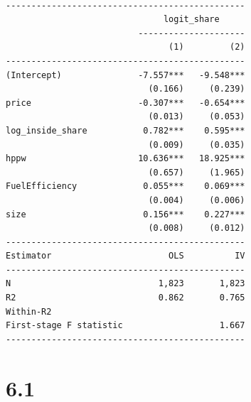 \documentclass[
  letterpaper,
  DIV=11,
  numbers=noendperiod]{scrreprt}
\begin{document}
\begin{verbatim}

-----------------------------------------------
                               logit_share     
                          ---------------------
                                (1)         (2)
-----------------------------------------------
(Intercept)               -7.557***   -9.548***
                            (0.166)     (0.239)
price                     -0.307***   -0.654***
                            (0.013)     (0.053)
log_inside_share           0.782***    0.595***
                            (0.009)     (0.035)
hppw                      10.636***   18.925***
                            (0.657)     (1.965)
FuelEfficiency             0.055***    0.069***
                            (0.004)     (0.006)
size                       0.156***    0.227***
                            (0.008)     (0.012)
-----------------------------------------------
Estimator                       OLS          IV
-----------------------------------------------
N                             1,823       1,823
R2                            0.862       0.765
Within-R2                                      
First-stage F statistic                   1.667
-----------------------------------------------
\end{verbatim}

\hypertarget{section-3}{%
\section{6.1}\label{section-3}}
\end{document}
